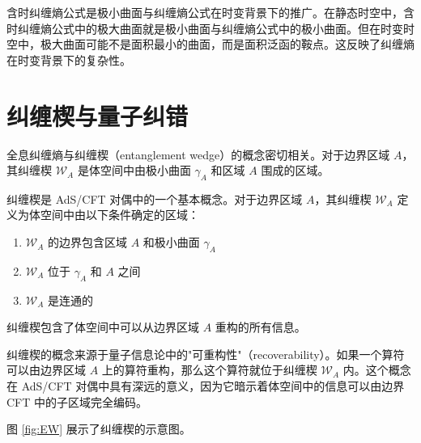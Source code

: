 \begin{remark}[含时纠缠熵公式与极小曲面与纠缠熵公式的关系]
含时纠缠熵公式是极小曲面与纠缠熵公式在时变背景下的推广。在静态时空中，含时纠缠熵公式中的极大曲面就是极小曲面与纠缠熵公式中的极小曲面。但在时变时空中，极大曲面可能不是面积最小的曲面，而是面积泛函的鞍点。这反映了纠缠熵在时变背景下的复杂性。
\end{remark}

\section{纠缠楔与量子纠错}

全息纠缠熵与纠缠楔（entanglement wedge）的概念密切相关。对于边界区域 $A$，其纠缠楔 $\mathcal{W}_A$ 是体空间中由极小曲面 $\gamma_A$ 和区域 $A$ 围成的区域。

\begin{definition}[纠缠楔]
纠缠楔是 AdS/CFT 对偶中的一个基本概念。对于边界区域 $A$，其纠缠楔 $\mathcal{W}_A$ 定义为体空间中由以下条件确定的区域：
\begin{enumerate}
    \item $\mathcal{W}_A$ 的边界包含区域 $A$ 和极小曲面 $\gamma_A$
    \item $\mathcal{W}_A$ 位于 $\gamma_A$ 和 $A$ 之间
    \item $\mathcal{W}_A$ 是连通的
\end{enumerate}
纠缠楔包含了体空间中可以从边界区域 $A$ 重构的所有信息。
\end{definition}

\begin{remark}[纠缠楔的物理意义]
纠缠楔的概念来源于量子信息论中的"可重构性"（recoverability）。如果一个算符可以由边界区域 $A$ 上的算符重构，那么这个算符就位于纠缠楔 $\mathcal{W}_A$ 内。这个概念在 AdS/CFT 对偶中具有深远的意义，因为它暗示着体空间中的信息可以由边界 CFT 中的子区域完全编码。
\end{remark}

图 \ref{fig:EW} 展示了纠缠楔的示意图。


